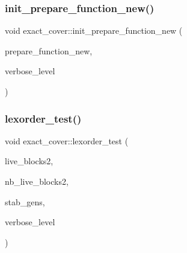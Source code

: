 \subsubsection{\texorpdfstring{init\+\_\+prepare\+\_\+function\+\_\+new()}{init\_prepare\_function\_new()}}
{\footnotesize\ttfamily void exact\+\_\+cover\+::init\+\_\+prepare\+\_\+function\+\_\+new (\begin{DoxyParamCaption}\item[{void($\ast$)(\mbox{\hyperlink{classexact__cover}{exact\+\_\+cover}} $\ast$E, \mbox{\hyperlink{galois_8h_a09fddde158a3a20bd2dcadb609de11dc}{I\+NT}} starter\+\_\+case, \mbox{\hyperlink{galois_8h_a09fddde158a3a20bd2dcadb609de11dc}{I\+NT}} $\ast$candidates, \mbox{\hyperlink{galois_8h_a09fddde158a3a20bd2dcadb609de11dc}{I\+NT}} nb\+\_\+candidates, \mbox{\hyperlink{classstrong__generators}{strong\+\_\+generators}} $\ast$Strong\+\_\+gens, \mbox{\hyperlink{classdiophant}{diophant}} $\ast$\&Dio, \mbox{\hyperlink{galois_8h_a09fddde158a3a20bd2dcadb609de11dc}{I\+NT}} $\ast$\&col\+\_\+label, \mbox{\hyperlink{galois_8h_a09fddde158a3a20bd2dcadb609de11dc}{I\+NT}} \&f\+\_\+ruled\+\_\+out, \mbox{\hyperlink{galois_8h_a09fddde158a3a20bd2dcadb609de11dc}{I\+NT}} \mbox{\hyperlink{simeon_8_c_a818073fbcc2f439e7c56952f67386122}{verbose\+\_\+level}})}]{prepare\+\_\+function\+\_\+new,  }\item[{\mbox{\hyperlink{galois_8h_a09fddde158a3a20bd2dcadb609de11dc}{I\+NT}}}]{verbose\+\_\+level }\end{DoxyParamCaption})}

\mbox{\label{classexact__cover_a5f11e25f122a6eecf845c5b6d5680de8}} 
\subsubsection{\texorpdfstring{lexorder\+\_\+test()}{lexorder\_test()}}
{\footnotesize\ttfamily void exact\+\_\+cover\+::lexorder\+\_\+test (\begin{DoxyParamCaption}\item[{\mbox{\hyperlink{galois_8h_a09fddde158a3a20bd2dcadb609de11dc}{I\+NT}} $\ast$}]{live\+\_\+blocks2,  }\item[{\mbox{\hyperlink{galois_8h_a09fddde158a3a20bd2dcadb609de11dc}{I\+NT}} \&}]{nb\+\_\+live\+\_\+blocks2,  }\item[{\mbox{\hyperlink{classvector__ge}{vector\+\_\+ge}} $\ast$}]{stab\+\_\+gens,  }\item[{\mbox{\hyperlink{galois_8h_a09fddde158a3a20bd2dcadb609de11dc}{I\+NT}}}]{verbose\+\_\+level }\end{DoxyParamCaption})}

